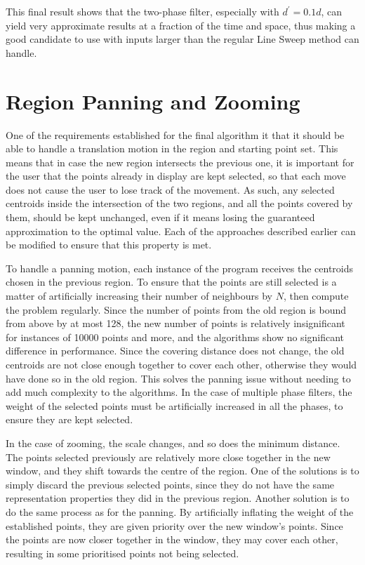 This final result shows that the two-phase filter, especially with $d^\prime=0.1d$, can yield very approximate results at a fraction of the time and space, thus making a good candidate to use with inputs larger than the regular Line Sweep method can handle.



\section{Region Panning and Zooming}
One of the requirements established for the final algorithm it that it should be able to handle a translation motion in the region and starting point set. This means that in case the new region intersects the previous one, it is important for the user that the points already in display are kept selected, so that each move does not cause the user to lose track of the movement. As such, any selected centroids inside the intersection of the two regions, and all the points covered by them, should be kept unchanged, even if it means losing the guaranteed approximation to the optimal value. Each of the approaches described earlier can be modified to ensure that this property is met. 

To handle a panning motion, each instance of the program receives the centroids chosen in the previous region. To ensure that the points are still selected is a matter of artificially increasing their number of neighbours by $N$, then compute the problem regularly.  Since the number of points from the old region is bound from above by at most 128, the new number of points is relatively insignificant for instances of 10000 points and more, and the algorithms show no significant difference in performance. Since the covering distance does not change, the old centroids are not close enough together to cover each other, otherwise they would have done so in the old region. This solves the panning issue without needing to add much complexity to the algorithms. In the case of multiple phase filters, the weight of the selected points must be artificially increased in all the phases, to ensure they are kept selected. 



In the case of zooming, the scale changes, and so does the minimum distance. The points selected previously are relatively more close together in the new window, and they shift towards the centre of the region. One of the solutions is to simply discard the previous selected points, since they do not have the same representation properties they did in the previous region. Another solution is to do the same process as for the panning. By artificially inflating the weight of the established points, they are given priority over the new window's points. Since the points are now closer together in the window, they may cover each other, resulting in some prioritised points not being selected. 


